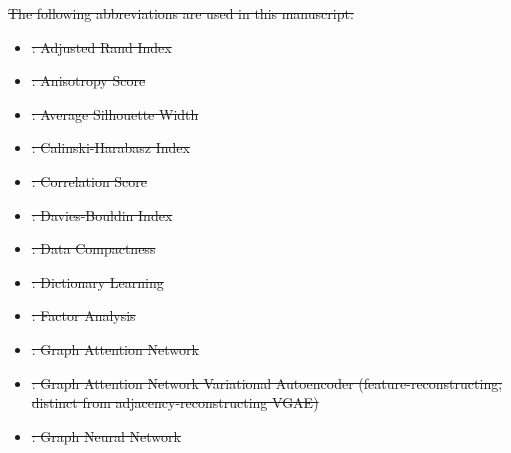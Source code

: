 \documentclass[referee, pdflatex, sn-vancouver-num]{sn-jnl}
\providecommand{\DIFdeltex}[1]{{\protect\color{red}\sout{#1}}}                      %
\providecommand{\DIFdelbegin}{} %
\providecommand{\DIFdel}[1]{\texorpdfstring{\DIFdeltex{#1}}{}} %
\newcommand{\DIFscaledelfig}{0.5}
\newlength{\DIFdelgraphicswidth} %
\newlength{\DIFdelgraphicsheight} %
\newcommand{\DIFdelincludegraphics}[2][]{%
\sbox{\DIFdelgraphicsbox}{\DIFOincludegraphics[#1]{#2}}%
\settoboxwidth{\DIFdelgraphicswidth}{\DIFdelgraphicsbox} %
\settoboxtotalheight{\DIFdelgraphicsheight}{\DIFdelgraphicsbox} %
\scalebox{\DIFscaledelfig}{%
\parbox[b]{\DIFdelgraphicswidth}{\usebox{\DIFdelgraphicsbox}\\[-\baselineskip] \rule{\DIFdelgraphicswidth}{0em}}\llap{\resizebox{\DIFdelgraphicswidth}{\DIFdelgraphicsheight}{%
\setlength{\unitlength}{\DIFdelgraphicswidth}%
\begin{picture}(1,1)%
\thicklines\linethickness{2pt} %
{\color[rgb]{1,0,0}\put(0,0){\framebox(1,1){}}}%
{\color[rgb]{1,0,0}\put(0,0){\line( 1,1){1}}}%
{\color[rgb]{1,0,0}\put(0,1){\line(1,-1){1}}}%
\end{picture}%
}\hspace*{3pt}}} %
} %
\DeclareRobustCommand{\DIFdelbegin}{\DIFOdelbegin \let\includegraphics\DIFdelincludegraphics} %
\begin{document}
\begin{appendices}
\DIFdelbegin %
\DIFdel{The following abbreviations are used in this manuscript:
}%
\begin{itemize}%
\item%
\DIFdel{: Adjusted Rand Index
    }%
\item%
\DIFdel{: Anisotropy Score
    }%
\item%
\DIFdel{: Average Silhouette Width
    }%
\item%
\DIFdel{: Calinski-Harabasz Index
    }%
\item%
\DIFdel{: Correlation Score
    }%
\item%
\DIFdel{: Davies-Bouldin Index
    }%
\item%
\DIFdel{: Data Compactness
    }%
\item%
\DIFdel{: Dictionary Learning
    }%
\item%
\DIFdel{: Factor Analysis
    }%
\item%
\DIFdel{: Graph Attention Network
    }%
\item%
\DIFdel{: Graph Attention Network Variational Autoencoder (feature-reconstructing; distinct from adjacency-reconstructing VGAE)
    }%
\item%
\DIFdel{: Graph Neural Network
}
\end{itemize}
\end{appendices}
\end{document}

